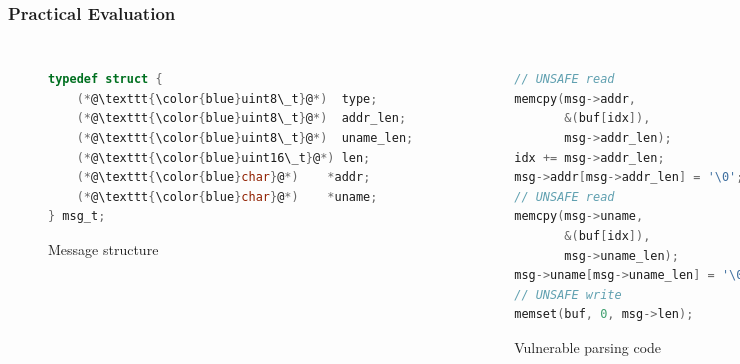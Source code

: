 \begin{frame}[fragile]
\frametitle{Practical Evaluation}

\begin{columns}[c]


\begin{figure}
\vspace*{-0.5cm}
\caption{Message structure}
\vspace*{-0.85cm}
\begin{lstlisting}[language=C,frame=single,numbers=none]
typedef struct {
    (*@\texttt{\color{blue}uint8\_t}@*)  type;
    (*@\texttt{\color{blue}uint8\_t}@*)  addr_len;
    (*@\texttt{\color{blue}uint8\_t}@*)  uname_len;
    (*@\texttt{\color{blue}uint16\_t}@*) len;
    (*@\texttt{\color{blue}char}@*)    *addr;
    (*@\texttt{\color{blue}char}@*)    *uname;
} msg_t;
\end{lstlisting}
\end{figure}

\begin{figure}
\vspace*{-1cm}
\caption{Vulnerable parsing code}
\vspace*{-1cm}
\begin{lstlisting}[language=C,frame=single,numbers=none]
// UNSAFE read
memcpy(msg->addr,
       &(buf[idx]),
       msg->addr_len);
idx += msg->addr_len;
msg->addr[msg->addr_len] = '\0';
// UNSAFE read
memcpy(msg->uname,
       &(buf[idx]),
       msg->uname_len);
msg->uname[msg->uname_len] = '\0';
// UNSAFE write
memset(buf, 0, msg->len);
\end{lstlisting}
\end{figure}



\begin{center}
\begin{figure}
\vspace*{-0.6cm}
\caption{\texttt{afl} run}
\vspace*{-0.5cm}
\includegraphics[scale=0.32]{../figures/afl-run}
\end{figure}
\end{center}


\end{columns}
\end{frame}
